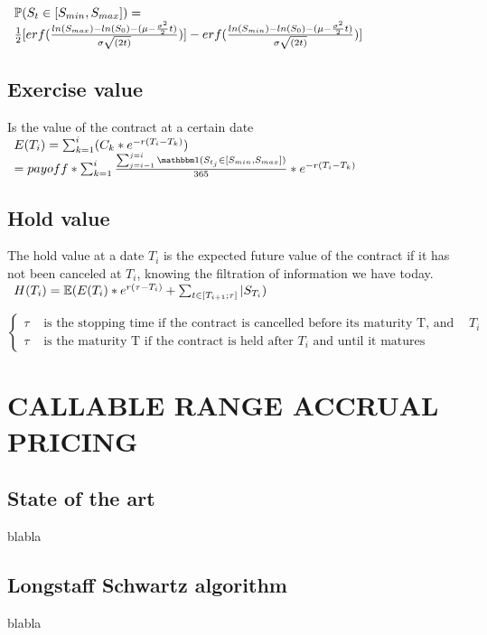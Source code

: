 \documentclass[12pt]{article}
\begin{document}
 					$\begin{array}{lcl}
 					\mathbb{P}(S_t \in [S_{min},S_{max}]) =\\ \frac{1}{2}[erf(\frac{ln(S_{max})-ln(S_0)-(\mu-\frac{\sigma^2}{2}t)}{\sigma \sqrt{(2t)}})]-erf(\frac{ln(S_{min})-ln(S_0)-(\mu-\frac{\sigma^2}{2}t)}{\sigma \sqrt{(2t)}})]
 					\end{array}$
	 	\subsection{Exercise value}
	 	
		 	Is the value of the contract at a certain date\\
		 	$\begin{array}{lcl}
			 	E(T_i) = \sum_{k = 1}^{i} (C_k * e^{-r(T_i - T_k)})\\
			 	=payoff * \sum_{k=1}^{i}\frac{\sum_{j=i - 1}^{j=i}\indicator (S_{t_j} \in [S_{min},S_{max}])}{365} * e^{-r(T_i - T_k)}
		 	\end{array}$
		 	
		 	
	 	\subsection{Hold value}
	 	The hold value at a date $T_i$ is the expected future value of the contract if it has not been canceled at $T_i$, knowing the filtration of information we have today.
	 	$\begin{array}{lcl}
		 	H(T_i) = \mathbb{E}(E(T_{i}) * e^{r(\tau-T_i)} + \sum_{t \in[T_{i+1}; \tau ]}|S_{T_i})
	 	\end{array}$
	 	
	 	$$
		\left\{
		 	\begin{array}{ll}
		 	\tau & \mbox{ is the stopping time if the contract is cancelled before its maturity T, and after $T_i$} \\
		 	\tau & \mbox{ is the maturity T if the contract is held after $T_i$  and until it matures}
		 	\end{array}
	\right.
	 	$$
	\section{CALLABLE RANGE ACCRUAL PRICING}
	\subsection{State of the art}
	blabla
	\subsection{Longstaff Schwartz algorithm}
	blabla
\end{document}
